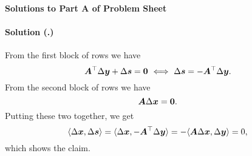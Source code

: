 \documentclass{article}
\newcounter{problemSheetNumber}
\newcounter{problems}
\renewcommand{\solution}[1]{\paragraph{Solution (\theproblemSheetNumber.\theproblems)}\addtocounter{problems}{1}\label{#1}}
\begin{document}
 
\begin{center}
{\Large {\bf Solutions to Part A of Problem Sheet \theproblemSheetNumber}}
\end{center}

\solution{pr:1} From the first block of rows we have
\begin{equation*}
 \bm{A}^{\top}\Delta\bm{y}+\Delta \bm{s} = \bm{0} \ \Longleftrightarrow \ \Delta \bm{s} = -\bm{A}^{\top}\Delta \bm{y}.
\end{equation*}
From the second block of rows we have
\begin{equation*}
 \bm{A}\Delta \bm{x} = \bm{0}.
\end{equation*}
Putting these two together, we get
\begin{equation*}
 \langle {\Delta\bm{x}}, {\Delta\bm{s}} \rangle = \langle {\Delta \bm{x}}, {-\bm{A}^{\top}\Delta\bm{y}} \rangle = -\langle {\bm{A}\Delta\bm{x}}, {\Delta\bm{y}} \rangle = 0,
\end{equation*}
which shows the claim.
\end{document}
